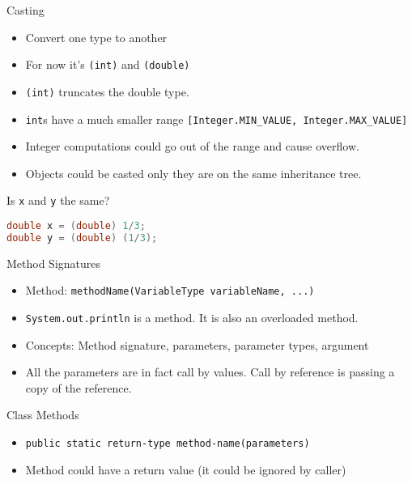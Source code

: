 \documentclass[aspectratio=169]{beamer}
\begin{document}
\begin{frame}[fragile]{Casting}
    \begin{itemize}
        \item Convert one type to another
        \item For now it's \verb|(int)| and \verb|(double)|
        \item \verb|(int)| truncates the double type.
        \item \verb|int|s have a much smaller range \verb|[Integer.MIN_VALUE, Integer.MAX_VALUE]|
        \item Integer computations could go out of the range and cause overflow.
        \item Objects could be casted only they are on the same inheritance tree.
    \end{itemize}
    Is \verb|x| and \verb|y| the same?
    \begin{lstlisting}[language=Java]
double x = (double) 1/3;
double y = (double) (1/3);
    \end{lstlisting}
\end{frame}


\begin{frame}[fragile]{Method Signatures}
    \begin{itemize}
        \item Method: \verb|methodName(VariableType variableName, ...)|
        \item \verb|System.out.println| is a method. It is also an \alert{overloaded} method.
        \item Concepts: Method signature, parameters, parameter types, argument        
        \item All the parameters are in fact call by \alert{values}. Call by reference is passing a copy of the reference.        
    \end{itemize}
\end{frame}

\begin{frame}[fragile]{Class Methods}
    \begin{itemize}
        \item \verb|public static return-type method-name(parameters)|
        \item Method could have a return value (it could be ignored by caller)
    \end{itemize}
\end{frame}
\end{document}
